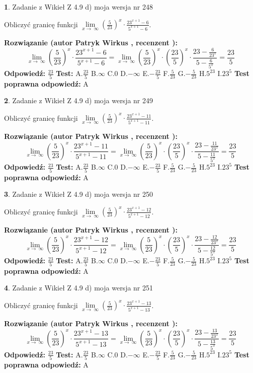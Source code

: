 \documentclass[12pt, a4paper]{article}
\theoremstyle{definition} %
\newtheorem{zad}{}
\newcommand{\zadStart}[1]{\begin{zad}#1\newline}
\newcommand{\zadStop}{\end{zad}}
\newcommand{\rozwStart}[2]{\noindent \textbf{Rozwiązanie (autor #1 , recenzent #2): }\newline}
\newcommand{\rozwStop}{\newline}
\newcommand{\odpStart}{\noindent \textbf{Odpowiedź:}\newline}
\newcommand{\odpStop}{\newline}
\newcommand{\testStart}{\noindent \textbf{Test:}\newline}
\newcommand{\testStop}{\newline}
\newcommand{\kluczStart}{\noindent \textbf{Test poprawna odpowiedź:}\newline}
\newcommand{\kluczStop}{\newline}
\begin{document}
\zadStart{Zadanie z Wikieł Z 4.9 d) moja wersja nr 248}


Obliczyć granicę funkcji  $\lim\limits_{x\to\ \infty}(\frac{5}{23})^{x}\cdot\frac{23^{x+1}-6}{5^{x+1}-6}$.
\zadStop
\rozwStart{Patryk Wirkus}{}
$$\lim\limits_{x\to\ \infty}(\frac{5}{23})^{x}\cdot\frac{23^{x+1}-6}{5^{x+1}-6}=\lim\limits_{x\to\ \infty}(\frac{5}{23})^{x}\cdot(\frac{23}{5})^{x} \cdot \frac{23-\frac{6}{23^{x}}}{5-\frac{6}{5^{x}}} = \frac{23}{5}$$
\rozwStop
\odpStart
$\frac{23}{5}$
\odpStop
\testStart
A.$\frac{23}{5}$ B.$\infty$ C.$0$ D.$-\infty$ E.$-\frac{23}{5}$
F.$\frac{5}{23}$ G.$-\frac{5}{23}$
H.$5^{23}$
I.$23^{5}$
\testStop
\kluczStart
A
\kluczStop



\zadStart{Zadanie z Wikieł Z 4.9 d) moja wersja nr 249}


Obliczyć granicę funkcji  $\lim\limits_{x\to\ \infty}(\frac{5}{23})^{x}\cdot\frac{23^{x+1}-11}{5^{x+1}-11}$.
\zadStop
\rozwStart{Patryk Wirkus}{}
$$\lim\limits_{x\to\ \infty}(\frac{5}{23})^{x}\cdot\frac{23^{x+1}-11}{5^{x+1}-11}=\lim\limits_{x\to\ \infty}(\frac{5}{23})^{x}\cdot(\frac{23}{5})^{x} \cdot \frac{23-\frac{11}{23^{x}}}{5-\frac{11}{5^{x}}} = \frac{23}{5}$$
\rozwStop
\odpStart
$\frac{23}{5}$
\odpStop
\testStart
A.$\frac{23}{5}$ B.$\infty$ C.$0$ D.$-\infty$ E.$-\frac{23}{5}$
F.$\frac{5}{23}$ G.$-\frac{5}{23}$
H.$5^{23}$
I.$23^{5}$
\testStop
\kluczStart
A
\kluczStop



\zadStart{Zadanie z Wikieł Z 4.9 d) moja wersja nr 250}


Obliczyć granicę funkcji  $\lim\limits_{x\to\ \infty}(\frac{5}{23})^{x}\cdot\frac{23^{x+1}-12}{5^{x+1}-12}$.
\zadStop
\rozwStart{Patryk Wirkus}{}
$$\lim\limits_{x\to\ \infty}(\frac{5}{23})^{x}\cdot\frac{23^{x+1}-12}{5^{x+1}-12}=\lim\limits_{x\to\ \infty}(\frac{5}{23})^{x}\cdot(\frac{23}{5})^{x} \cdot \frac{23-\frac{12}{23^{x}}}{5-\frac{12}{5^{x}}} = \frac{23}{5}$$
\rozwStop
\odpStart
$\frac{23}{5}$
\odpStop
\testStart
A.$\frac{23}{5}$ B.$\infty$ C.$0$ D.$-\infty$ E.$-\frac{23}{5}$
F.$\frac{5}{23}$ G.$-\frac{5}{23}$
H.$5^{23}$
I.$23^{5}$
\testStop
\kluczStart
A
\kluczStop



\zadStart{Zadanie z Wikieł Z 4.9 d) moja wersja nr 251}


Obliczyć granicę funkcji  $\lim\limits_{x\to\ \infty}(\frac{5}{23})^{x}\cdot\frac{23^{x+1}-13}{5^{x+1}-13}$.
\zadStop
\rozwStart{Patryk Wirkus}{}
$$\lim\limits_{x\to\ \infty}(\frac{5}{23})^{x}\cdot\frac{23^{x+1}-13}{5^{x+1}-13}=\lim\limits_{x\to\ \infty}(\frac{5}{23})^{x}\cdot(\frac{23}{5})^{x} \cdot \frac{23-\frac{13}{23^{x}}}{5-\frac{13}{5^{x}}} = \frac{23}{5}$$
\rozwStop
\odpStart
$\frac{23}{5}$
\odpStop
\testStart
A.$\frac{23}{5}$ B.$\infty$ C.$0$ D.$-\infty$ E.$-\frac{23}{5}$
F.$\frac{5}{23}$ G.$-\frac{5}{23}$
H.$5^{23}$
I.$23^{5}$
\testStop
\kluczStart
A
\kluczStop
\end{document}
